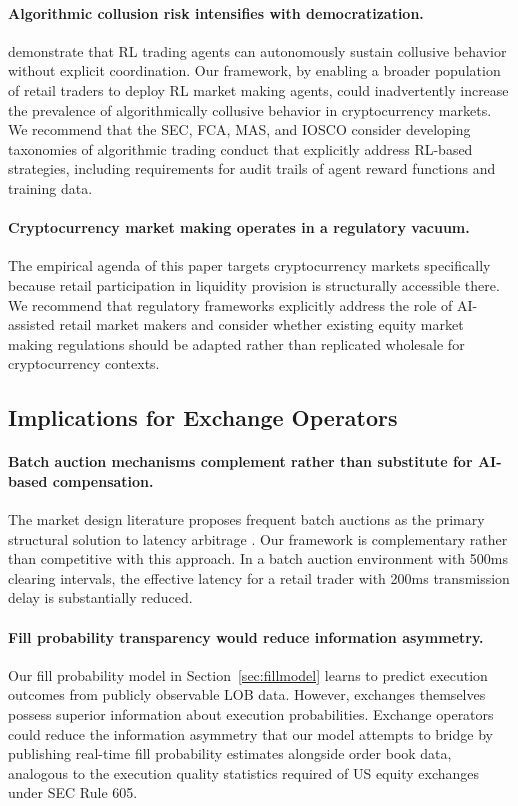 \documentclass[12pt]{article}
\begin{document}
\paragraph{Algorithmic collusion risk intensifies with democratization.} \citet{dou2025} demonstrate that RL trading agents can autonomously sustain collusive behavior without explicit coordination. Our framework, by enabling a broader population of retail traders to deploy RL market making agents, could inadvertently increase the prevalence of algorithmically collusive behavior in cryptocurrency markets. We recommend that the SEC, FCA, MAS, and IOSCO consider developing taxonomies of algorithmic trading conduct that explicitly address RL-based strategies, including requirements for audit trails of agent reward functions and training data.

\paragraph{Cryptocurrency market making operates in a regulatory vacuum.} The empirical agenda of this paper targets cryptocurrency markets specifically because retail participation in liquidity provision is structurally accessible there. We recommend that regulatory frameworks explicitly address the role of AI-assisted retail market makers and consider whether existing equity market making regulations should be adapted rather than replicated wholesale for cryptocurrency contexts.

\subsection{Implications for Exchange Operators}

\paragraph{Batch auction mechanisms complement rather than substitute for AI-based compensation.} The market design literature proposes frequent batch auctions as the primary structural solution to latency arbitrage \citep{budish2015,aquilina2022}. Our framework is complementary rather than competitive with this approach. In a batch auction environment with 500ms clearing intervals, the effective latency for a retail trader with 200ms transmission delay is substantially reduced.

\paragraph{Fill probability transparency would reduce information asymmetry.} Our fill probability model in Section~\ref{sec:fillmodel} learns to predict execution outcomes from publicly observable LOB data. However, exchanges themselves possess superior information about execution probabilities. Exchange operators could reduce the information asymmetry that our model attempts to bridge by publishing real-time fill probability estimates alongside order book data, analogous to the execution quality statistics required of US equity exchanges under SEC Rule 605.
\end{document}
